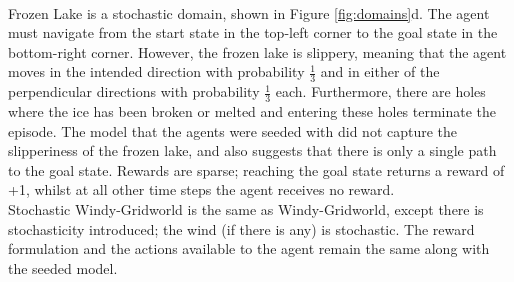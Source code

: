 \\Frozen Lake is a stochastic domain, shown in Figure \ref{fig:domains}d. The agent must navigate from the start state in the top-left corner to the goal state in the bottom-right corner. However, the frozen lake is slippery, meaning that the agent moves in the intended direction with probability $\frac{1}{3}$ and in either of the perpendicular directions with probability $\frac{1}{3}$ each. Furthermore, there are holes where the ice has been broken or melted and entering these holes terminate the episode. The model that the agents were seeded with did not capture the slipperiness of the frozen lake, and also suggests that there is only a single path to the goal state. Rewards are sparse; reaching the goal state returns a reward of +1, whilst at all other time steps the agent receives no reward.
\\Stochastic Windy-Gridworld is the same as Windy-Gridworld, except there is stochasticity introduced;  the wind (if there is any) is stochastic. The reward formulation and the actions available to the agent remain the same along with the seeded model.




